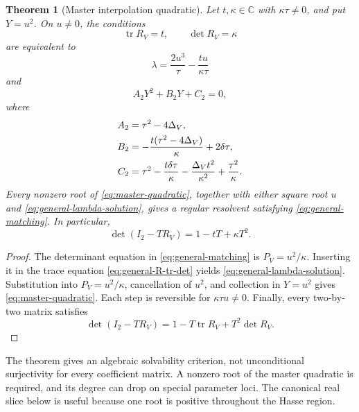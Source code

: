 \documentclass[11pt,reqno]{amsart}
\newtheorem{theorem}{Theorem}[section]
\theoremstyle{remark}
\newcommand{\C}{\mathbb C}
\newcommand{\tr}{\operatorname{tr}}
\begin{document}
\begin{theorem}[Master interpolation quadratic]\label{thm:master-interpolation}
Let $t,\kappa\in\C$ with $\kappa\tau\ne0$, and put $Y=u^2$.  On $u\ne0$, the
conditions
\begin{equation}\label{eq:general-matching}
 \tr R_V=t,
 \qquad
 \det R_V=\kappa
\end{equation}
are equivalent to
\begin{equation}\label{eq:general-lambda-solution}
 \lambda=\frac{2u^3}{\tau}-\frac{tu}{\kappa\tau}
\end{equation}
and
\begin{equation}\label{eq:master-quadratic}
 A_2Y^2+B_2Y+C_2=0,
\end{equation}
where
\begin{align}
 A_2&=\tau^2-4\Delta_V,\notag\\
 B_2&=-\frac{t(\tau^2-4\Delta_V)}\kappa+2\delta\tau,
 \label{eq:master-coefficients}\\
 C_2&=\tau^2-\frac{t\delta\tau}\kappa
 -\frac{\Delta_Vt^2}{\kappa^2}+\frac{\tau^2}{\kappa}.
 \notag
\end{align}
Every nonzero root of \eqref{eq:master-quadratic}, together with either
square root $u$ and \eqref{eq:general-lambda-solution}, gives a regular
resolvent satisfying \eqref{eq:general-matching}.  In particular,
\begin{equation}\label{eq:general-prescribed-polynomial}
 \det(I_2-TR_V)=1-tT+\kappa T^2.
\end{equation}
\end{theorem}

\begin{proof}
The determinant equation in \eqref{eq:general-matching} is
$P_V=u^2/\kappa$.  Inserting it in the trace equation
\eqref{eq:general-R-tr-det} yields
\eqref{eq:general-lambda-solution}.  Substitution into $P_V=u^2/\kappa$,
cancellation of $u^2$, and collection in $Y=u^2$ gives
\eqref{eq:master-quadratic}.  Each step is reversible for
$\kappa\tau u\ne0$.
Finally, every two-by-two matrix satisfies
\[
 \det(I_2-TR_V)=1-T\tr R_V+T^2\det R_V.
\]
\end{proof}

The theorem gives an algebraic solvability criterion, not unconditional
surjectivity for every coefficient matrix.  A nonzero root of the master
quadratic is required, and its degree can drop on special parameter loci.
The canonical real slice below is useful because one root is positive
throughout the Hasse region.
\end{document}
